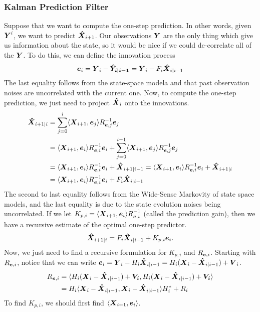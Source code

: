 \subsubsection{Kalman Prediction Filter}
Suppose that we want to compute the one-step prediction.
In other words, given $\boldsymbol{Y}^i$, we want to predict $\boldsymbol{\hat{X}}_{i+1}$.
Our observations $\boldsymbol{Y}$ are the only thing which give us information about the state, so it would be nice if we could de-correlate all of the $\boldsymbol{Y}$.
To do this, we can define the innovation process \[
	\boldsymbol{e}_i = \boldsymbol{Y}_i - \boldsymbol{\hat{Y}_{i|i-1}} = \boldsymbol{Y}_i - F_i\boldsymbol{\hat{X}}_{i|i-1}
\]
The last equality follows from the state-space modela and that past observation noises are uncorrelated with the current one.
Now, to compute the one-step prediction, we just need to project $\boldsymbol{\hat{X}}_i$ onto the innovations.
\begin{align*}
	\boldsymbol{\hat{X}}_{i+1|i} &= \sum_{j=0}^i\langle \boldsymbol{X}_{i+1}, \boldsymbol{e}_j \rangle R_{\boldsymbol{e},j}^{-1}\boldsymbol{e}_j \\
	&= \langle \boldsymbol{X}_{i+1}, \boldsymbol{e}_{i} \rangle R_{\boldsymbol{e},i}^{-1}\boldsymbol{e}_i + \sum_{j=0}^{i-1}\langle \boldsymbol{X}_{i+1}, \boldsymbol{e}_j \rangle R_{\boldsymbol{e},j}^{-1}\boldsymbol{e}_j\\
	&= \langle \boldsymbol{X}_{i+1}, \boldsymbol{e}_{i} \rangle R_{\boldsymbol{e},i}^{-1}\boldsymbol{e}_i + \boldsymbol{\hat{X}}_{i+1|i-1} = \langle \boldsymbol{X}_{i+1}, \boldsymbol{e}_{i} \rangle R_{\boldsymbol{e},i}^{-1}\boldsymbol{e}_i + \boldsymbol{\hat{X}}_{i+1|i}\\
	&= \langle \boldsymbol{X}_{i+1}, \boldsymbol{e}_{i} \rangle R_{\boldsymbol{e},i}^{-1}\boldsymbol{e}_i + F_i\boldsymbol{\hat{X}}_{i|i-1}
\end{align*}
The second to last equality follows from the Wide-Sense Markovity of state space models, and the last equality is due to the state evolution noises being uncorrelated.
If we let $K_{p,i} = \langle \boldsymbol{X}_{i+1}, \boldsymbol{e}_i \rangle R_{\boldsymbol{e},i}^{-1}$ (called the prediction gain), then we have a recursive estimate of the optimal one-step predictor.
\[
	\boldsymbol{\hat{X}}_{i+1|i} = F_i\boldsymbol{\hat{X}}_{i|i-1} + K_{p,i}\boldsymbol{e}_i.
\]
Now, we just need to find a recursive formulation for $K_{p,i}$ and $R_{\boldsymbol{e},i}$.
Starting with $R_{\boldsymbol{e},i}$, notice that we can write $\boldsymbol{e}_i = \boldsymbol{Y}_i-H_i\boldsymbol{\hat{X}}_{i|i-1} = H_i(\boldsymbol{X}_i-\boldsymbol{\hat{X}}_{i|i-1})+\boldsymbol{V}_i$.
\begin{align*}
	R_{\boldsymbol{e},i} &= \langle H_i(\boldsymbol{X}_i - \boldsymbol{\hat{X}}_{i|i-1})+ \boldsymbol{V_i}, H_i(\boldsymbol{X}_i - \boldsymbol{\hat{X}}_{i|i-1})+\boldsymbol{V_i} \rangle\\
	&= H_i\langle \boldsymbol{X}_i - \boldsymbol{\hat{X}}_{i|i-1}, \boldsymbol{X}_i - \boldsymbol{\hat{X}}_{i|i-1} \rangle H_i^* + R_i
\end{align*}
To find $K_{p,i}$, we should first find $\langle \boldsymbol{X}_{i+1}, \boldsymbol{e}_i \rangle$.
